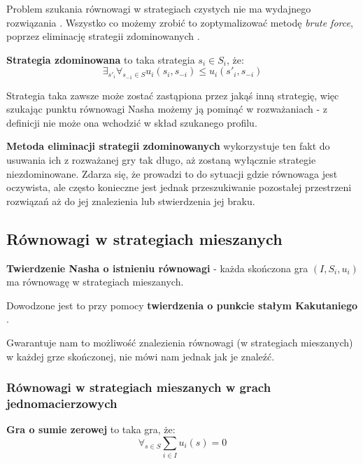\documentclass[polish]{standalone}
\begin{document}
Problem szukania równowagi w strategiach czystych nie ma wydajnego rozwiązania \cite[str.~16]{FT-GT}. Wszystko co
możemy zrobić to zoptymalizować metodę \textit{brute force}, poprzez eliminację strategii zdominowanych
\cite[str.~9--11]{FT-GT}.

\begin{definition}
\textbf{Strategia zdominowana} to taka strategia $s_i \in S_i$, że:
$$\exists_{s'_i} \forall_{s_{-1} \in S} u_i(s_i, s_{-i}) \leq u_i(s'_i, s_{-i})$$
\cite[str.~6--7]{FT-GT}
\end{definition}

Strategia taka zawsze może zostać zastąpiona przez jakąś inną strategię, więc szukając punktu równowagi Nasha możemy ją
pominąć w rozważaniach - z definicji nie może ona wchodzić w skład szukanego profilu.

\textbf{Metoda eliminacji strategii zdominowanych} wykorzystuje ten fakt do usuwania ich z rozważanej gry tak długo, aż
zostaną wyłącznie strategie niezdominowane. Zdarza się, że prowadzi to do sytuacji gdzie równowaga jest oczywista, ale
często konieczne jest jednak przeszukiwanie pozostałej przestrzeni rozwiązań aż do jej znalezienia lub stwierdzenia jej
braku.

\subsection{Równowagi w strategiach mieszanych}

\begin{theorem}
\textbf{Twierdzenie Nasha o istnieniu równowagi} - każda skończona gra $(I, S_i, u_i)$ ma równowagę w strategiach
mieszanych.
\cite[str.~29]{FT-GT}
\end{theorem}

Dowodzone jest to przy pomocy \textbf{twierdzenia o punkcie stałym Kakutaniego} \cite[str.~29]{FT-GT}.

Gwarantuje nam to możliwość znalezienia równowagi (w strategiach mieszanych) w każdej grze skończonej, nie mówi nam
jednak jak je znaleźć.

\subsubsection{Równowagi w strategiach mieszanych w grach jednomacierzowych}

\begin{definition}
\textbf{Gra o sumie zerowej} to taka gra, że:
$$\forall_{s \in S} \sum_{i \in I} u_i(s) = 0$$
\end{definition}
\end{document}
